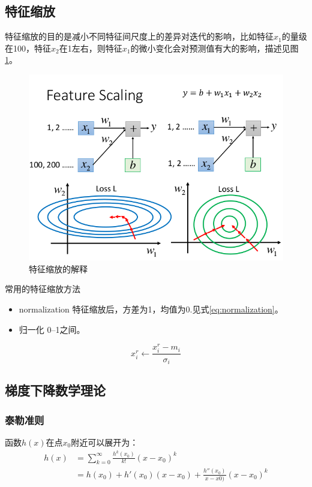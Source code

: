 \subsection{特征缩放}
特征缩放的目的是减小不同特征间尺度上的差异对迭代的影响，比如特征$x_1$的量级在100，特征$x_2$在1左右，则特征$x_1$的微小变化会对预测值有大的影响，描述见图\ref{fig:feature_scaling}。
\begin{figure}
	\centering
	\includegraphics[scale=0.5]{pic/feature_scaling}
	\caption{特征缩放的解释}
	\label{fig:feature_scaling}
\end{figure}

常用的特征缩放方法
\begin{itemize}
	\item normalization 特征缩放后，方差为1，均值为0.见式\eqref{eq:normalization}。
	\item 归一化 0--1之间。
\end{itemize}

\begin{equation}\label{eq:normalization}
x _ { i } ^ { r } \leftarrow \frac { x _ { i } ^ { r } - m _ { i } } { \sigma _ { i } }
\end{equation}
\subsection{梯度下降数学理论}
\subsubsection{泰勒准则}
函数$h(x)$在点$x_0$附近可以展开为：
\begin{align*}
h(x) &= \sum_{k=0}^{\infty}\frac{h^k(x_0)}{k!}(x-x_0)^k\\
	&=h(x_0) + h'(x_0)(x-x_0) + \frac{h''(x_0)}{x-x0)}(x-x_0)^k
\end{align*}
